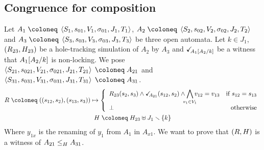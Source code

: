 \documentclass{article}
\begin{document}
\subsection{Congruence for composition}\label{apx:cong}
Let \(A_1 \defobject \OAg[1]\), \(A_2 \defobject \OAg[2]\) and \(A_3 \defobject \OAg[3]\) be three open automata.
Let \(k \in J_1\), \(\mpar{R_{23}, H_{23}}\) be a hole-tracking simulation of \(A_2\) by \(A_3\) and \(\reach{A_1\subst{A_2}{k}}\) be a witness that \(A_1\subst{A_2}{k}\) is non-locking.
We pose \(\OAg[21] \defobject A_{21}\) and \(\OAg[31] \defobject A_{31}\).
\begin{gather*}
	R \defobject \mpar{\mpar{s_{12}, s_2}, \mpar{s_{13}, s_3}} \mapsto \choice{R_{23}\mpar{s_2, s_3} \wedge \reach{A_{21}}\mpar{s_{12}, s_2} \wedge \bigwedge_\subbox{v_1 \in V_1} v_{12} = v_{13} & \text{if } s_{12} = s_{13} \\ \bot & \text{otherwise}} \\
	H \defobject H_{23} \uplus J_1 \setminus \mbrc{k}
\end{gather*}
Where \(y_{1x}\) is the renaming of \(y_1\) from \(A_1\) in \(A_{x1}\).
We want to prove that \(\mpar{R, H}\) is a witness of \(\wrel{A_{21}}{A_{31}}{H}\).
\end{document}
